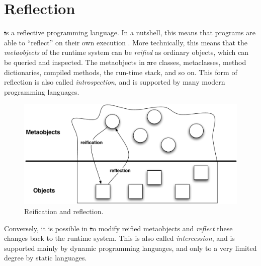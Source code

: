 \documentclass[a4paper,10pt,twoside]{book}
\begin{document}
	\sloppy
\fi


\chapter{Reflection}\label{cha:reflection}





\st is a reflective programming language.
In a nutshell, this means that programs are able to ``reflect'' on their own execution . 
More technically, this means that the \emph{metaobjects} of the runtime system can be \emph{reified} as ordinary objects, which can be queried and inspected.
The metaobjects in \st are classes, metaclasses, method dictionaries, compiled methods, the run-time stack, and so on.
This form of reflection is also called \emph{introspection}, and is supported by many modern programming languages.

\begin{figure}[ht]\centering
	\includegraphics[width=0.8\linewidth]{reflect}
	\caption{Reification and reflection.\label{fig:reflect}}
\end{figure}

Conversely, it is possible in \st to modify reified metaobjects and \emph{reflect} these changes back to the runtime system.
This is also called \emph{intercession}, and is supported mainly by dynamic programming languages, and only to a very limited degree by static languages.
\end{document}
